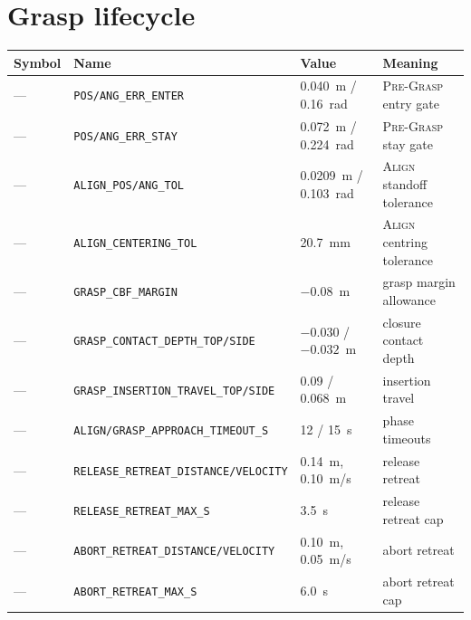 \documentclass[12pt,a4paper,twoside,openright]{report}
\begin{document}
\section{Grasp lifecycle}
\begin{tabularx}{\linewidth}{@{}lllX@{}}
\toprule
Symbol & Name & Value & Meaning \\
\midrule
--- & \texttt{POS/ANG\_ERR\_ENTER} & 0.040~m / 0.16~rad & \textsc{Pre-Grasp} entry gate \\
--- & \texttt{POS/ANG\_ERR\_STAY} & 0.072~m / 0.224~rad & \textsc{Pre-Grasp} stay gate \\
--- & \texttt{ALIGN\_POS/ANG\_TOL} & 0.0209~m / 0.103~rad & \textsc{Align} standoff tolerance \\
--- & \texttt{ALIGN\_CENTERING\_TOL} & 20.7~mm & \textsc{Align} centring tolerance \\
--- & \texttt{GRASP\_CBF\_MARGIN} & $-0.08$~m & grasp margin allowance \\
--- & \texttt{GRASP\_CONTACT\_DEPTH\_TOP/SIDE} & $-0.030$ / $-0.032$~m & closure contact depth \\
--- & \texttt{GRASP\_INSERTION\_TRAVEL\_TOP/SIDE} & 0.09 / 0.068~m & insertion travel \\
--- & \texttt{ALIGN/GRASP\_APPROACH\_TIMEOUT\_S} & 12 / 15~s & phase timeouts \\
--- & \texttt{RELEASE\_RETREAT\_DISTANCE/VELOCITY} & 0.14~m, 0.10~m/s & release retreat \\
--- & \texttt{RELEASE\_RETREAT\_MAX\_S} & 3.5~s & release retreat cap \\
--- & \texttt{ABORT\_RETREAT\_DISTANCE/VELOCITY} & 0.10~m, 0.05~m/s & abort retreat \\
--- & \texttt{ABORT\_RETREAT\_MAX\_S} & 6.0~s & abort retreat cap \\
\bottomrule
\end{tabularx}
\end{document}
